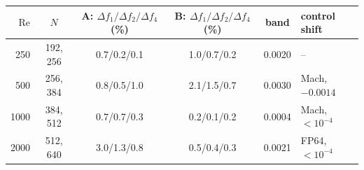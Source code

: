 \begin{tabular}{rccccl}
$\mathrm{Re}$ & $N$ & A: $\Delta f_1/\Delta f_2/\Delta f_4$ (\%) & B: $\Delta f_1/\Delta f_2/\Delta f_4$ (\%) & band & control shift \\
\hline
250 & 192, 256 & 0.7/0.2/0.1 & 1.0/0.7/0.2 & 0.0020 & -- \\
500 & 256, 384 & 0.8/0.5/1.0 & 2.1/1.5/0.7 & 0.0030 & Mach, $-0.0014$ \\
1000 & 384, 512 & 0.7/0.7/0.3 & 0.2/0.1/0.2 & 0.0004 & Mach, $<10^{-4}$ \\
2000 & 512, 640 & 3.0/1.3/0.8 & 0.5/0.4/0.3 & 0.0021 & FP64, $<10^{-4}$ \\
\end{tabular}

